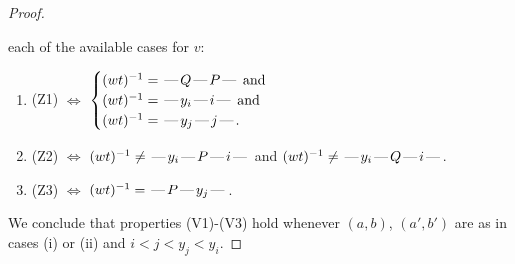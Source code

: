 \documentclass[10pt]{article}
\theoremstyle{definition}
\theoremstyle{definition}
\def\dash{\text{\hspace{0.5mm}---\hspace{0.5mm}}}
\begin{document}
\begin{proof}
\begin{enumerate}
each of the available cases for $v$:
\begin{enumerate}
\item[](Z1) $\Leftrightarrow$ $\begin{cases}\text{$(wt)^{-1} = \dash Q \dash P \dash$}\text{ and }\\
\text{$(wt)^{-1} = \dash y_i \dash i \dash$}\text{ and }\\
\text{$(wt)^{-1} = \dash y_j \dash j \dash$}.\end{cases}$
\item[](Z2) $\Leftrightarrow$ $(wt)^{-1} \neq \dash y_i \dash P \dash i \dash$ and $(wt)^{-1}\neq \dash y_i \dash Q \dash i \dash$.
\item[](Z3) $\Leftrightarrow$ $(wt)^{-1} = \dash P \dash y_j \dash$.
\end{enumerate}
\end{enumerate}
We conclude that properties (V1)-(V3) hold whenever
$(a,b)$, $(a',b')$ are as in cases (i) or (ii) and $i < j < y_j < y_i$.

\end{proof}
\end{document}
